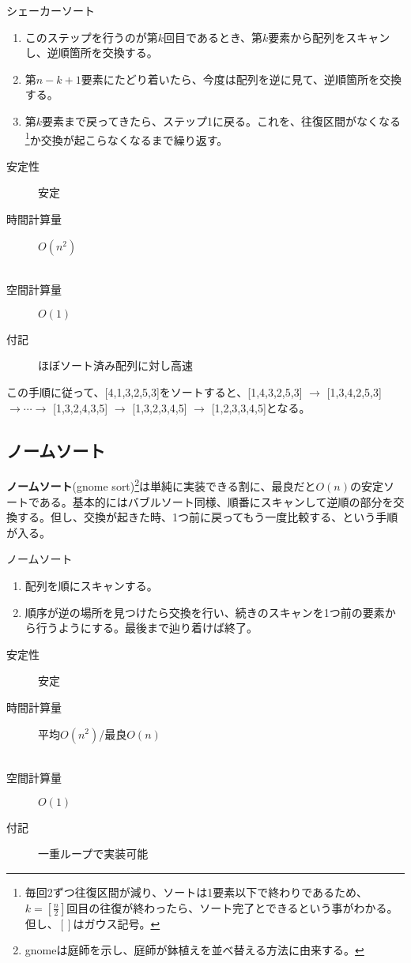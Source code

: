 \begin{itembox}[l]{シェーカーソート}
\begin{enumerate}
\item このステップを行うのが第$k$回目であるとき、第$k$要素から配列をスキャンし、逆順箇所を交換する。
\item 第$n-k+1$要素にたどり着いたら、今度は配列を逆に見て、逆順箇所を交換する。
\item 第$k$要素まで戻ってきたら、ステップ1に戻る。これを、往復区間がなくなる\footnote{毎回2ずつ往復区間が減り、ソートは1要素以下で終わりであるため、$k=\left[\frac{n}{2}\right]$回目の往復が終わったら、ソート完了とできるという事がわかる。但し、$[]$はガウス記号。}か交換が起こらなくなるまで繰り返す。
\end{enumerate}
\begin{multicols}{2}
\begin{description}
\item[安定性] 安定
\item[時間計算量] $O(n^2)$　\\　
\item[空間計算量] $O(1)$
\item[付記] ほぼソート済み配列に対し高速
\end{description}
\end{multicols}
\end{itembox}

この手順に従って、[4,1,3,2,5,3]をソートすると、[1,4,3,2,5,3] $\rightarrow$ [1,3,4,2,5,3] $\rightarrow\cdots\rightarrow$ [1,3,2,4,3,5] $\rightarrow$ [1,3,2,3,4,5] $\rightarrow$ [1,2,3,3,4,5]となる。

\subsection{ノームソート}
\textbf{ノームソート}(gnome sort)\footnote{gnomeは庭師を示し、庭師が鉢植えを並べ替える方法に由来する。}は単純に実装できる割に、最良だと$O(n)$の安定ソートである。基本的にはバブルソート同様、順番にスキャンして逆順の部分を交換する。但し、交換が起きた時、1つ前に戻ってもう一度比較する、という手順が入る。
\begin{itembox}[l]{ノームソート}
\begin{enumerate}
\item 配列を順にスキャンする。
\item 順序が逆の場所を見つけたら交換を行い、続きのスキャンを1つ前の要素から行うようにする。最後まで辿り着けば終了。
\end{enumerate}
\begin{multicols}{2}
\begin{description}
\item[安定性] 安定
\item[時間計算量] 平均$O(n^2)$/最良$O(n)$　\\　
\item[空間計算量] $O(1)$
\item[付記] 一重ループで実装可能
\end{description}
\end{multicols}
\end{itembox}

